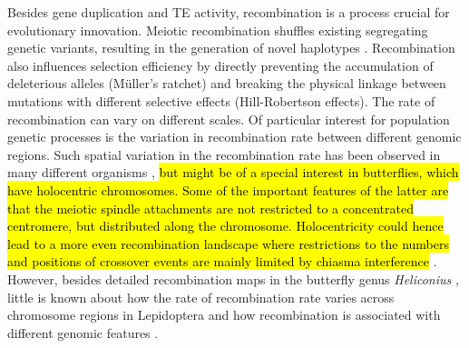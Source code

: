 \documentclass[twocolumn]{bmcart}%
\begin{document}
Besides gene duplication and TE activity, recombination is a process crucial for evolutionary innovation. Meiotic recombination shuffles existing segregating genetic variants, resulting in the generation of novel haplotypes \cite{penalbaMoleculesPopulationsAppreciating2020}. Recombination also influences selection efficiency by directly preventing the accumulation of deleterious alleles (Müller's ratchet) and breaking the physical linkage between mutations with different selective effects (Hill-Robertson effects). The rate of recombination can vary on different scales. Of particular interest for population genetic processes is the variation in recombination rate between different genomic regions. Such spatial variation in the recombination rate has been observed in many different organisms \cite{stapleyVariationRecombinationFrequency2017, tileyRelationshipRecombinationRate2015}, \hl{but might be of a special interest in butterflies, which have holocentric chromosomes. Some of the important features of the latter are that the meiotic spindle attachments are not restricted to a concentrated centromere, but distributed along the chromosome. Holocentricity could hence lead to a more even recombination landscape where restrictions to the numbers and positions of crossover events are mainly limited by chiasma interference} \cite{barnesMeioticRecombinationNoncoding1995}. However, besides detailed recombination maps in the butterfly genus \textit{Heliconius} \cite{martinRecombinationRateVariation2019}, little is known about how the rate of recombination rate varies across chromosome regions in Lepidoptera and how recombination is associated with different genomic features \cite{haenelMetaanalysisChromosomescaleCrossover2018, tallaDissectingEffectsSelection2019}.
\end{document}
